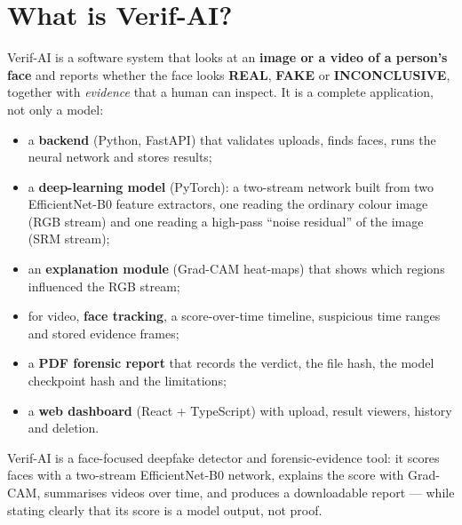 \documentclass[11pt,a4paper]{report}
\begin{document}
\section{What is Verif-AI?}
Verif-AI is a software system that looks at an \textbf{image or a video of a person's face} and reports whether the face looks \textbf{REAL}, \textbf{FAKE} or \textbf{INCONCLUSIVE}, together with
\emph{evidence} that a human can inspect. It is a complete application, not only a model:
\begin{itemize}
\item a \textbf{backend} (Python, FastAPI) that validates uploads, finds faces, runs the neural network and stores results;
\item a \textbf{deep-learning model} (PyTorch): a two-stream network built from two EfficientNet-B0 feature extractors, one reading the ordinary colour image (RGB stream) and one reading a
high-pass ``noise residual'' of the image (SRM stream);
\item an \textbf{explanation module} (Grad-CAM heat-maps) that shows which regions influenced the RGB stream;
\item for video, \textbf{face tracking}, a score-over-time timeline, suspicious time ranges and stored evidence frames;
\item a \textbf{PDF forensic report} that records the verdict, the file hash, the model checkpoint hash and the limitations;
\item a \textbf{web dashboard} (React + TypeScript) with upload, result viewers, history and deletion.
\end{itemize}

\begin{keybox}
Verif-AI is a face-focused deepfake detector and forensic-evidence tool: it scores faces with a two-stream EfficientNet-B0 network, explains the score with Grad-CAM, summarises videos over time,
and produces a downloadable report --- while stating clearly that its score is a model output, not proof.
\end{keybox}
\end{document}
